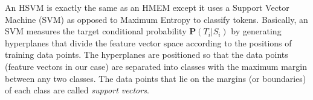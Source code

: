 An HSVM is exactly the same as an HMEM except it uses 
a Support Vector Machine (SVM) \cite{CC01a} as opposed to Maximum Entropy
to classify tokens. 
Basically, an SVM measures the target conditional probability 
$\mathbf{P}(T_i|S_i)$ 
by generating hyperplanes that divide the feature vector space according to the
positions of training data points. The hyperplanes are positioned so that the
data points (feature vectors in our case) are separated into classes with
the maximum margin between any two classes. The data points that lie on
the margins (or boundaries) of each class are called {\em support vectors}. 

